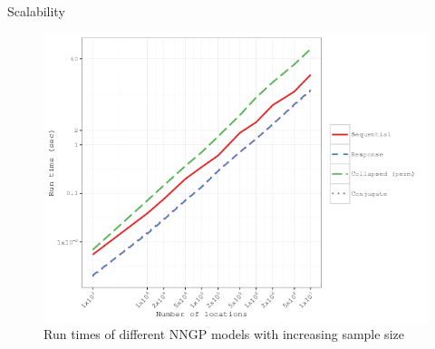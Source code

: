 \begin{frame}{Scalability}
\begin{figure}
\center
\includegraphics[scale=0.45]{../figures/model-n-vs-time.png}
\caption{Run times of different NNGP models with increasing sample size}
\end{figure}
\end{frame}

